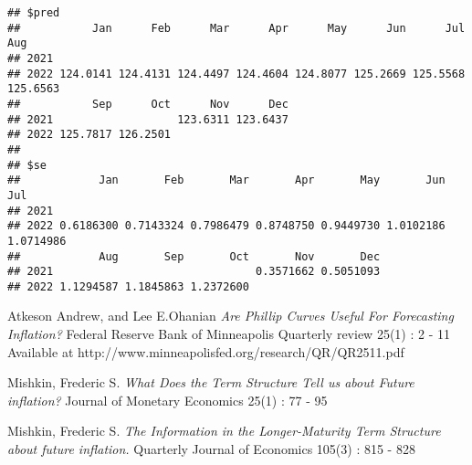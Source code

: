 \documentclass[
  12pt,
]{article}
\begin{document}
\begin{verbatim}
## $pred
##           Jan      Feb      Mar      Apr      May      Jun      Jul      Aug
## 2021                                                                        
## 2022 124.0141 124.4131 124.4497 124.4604 124.8077 125.2669 125.5568 125.6563
##           Sep      Oct      Nov      Dec
## 2021                   123.6311 123.6437
## 2022 125.7817 126.2501                  
## 
## $se
##            Jan       Feb       Mar       Apr       May       Jun       Jul
## 2021                                                                      
## 2022 0.6186300 0.7143324 0.7986479 0.8748750 0.9449730 1.0102186 1.0714986
##            Aug       Sep       Oct       Nov       Dec
## 2021                               0.3571662 0.5051093
## 2022 1.1294587 1.1845863 1.2372600
\end{verbatim}

\pagebreak
\begin{thebibliography}{}
    Atkeson Andrew, and Lee E.Ohanian
    \textit{Are Phillip Curves Useful For Forecasting Inflation?}
    Federal Reserve Bank of Minneapolis Quarterly review
    25(1) : 2 - 11
    Available at  http://www.minneapolisfed.org/research/QR/QR2511.pdf 
    
    Mishkin, Frederic S.
    \textit{What Does the Term Structure Tell us about Future inflation?}
    Journal of Monetary Economics 
    25(1) : 77 - 95
    
    Mishkin, Frederic S.
    \textit{The Information in the Longer-Maturity Term Structure about future inflation.}
    Quarterly Journal of Economics 
    105(3) : 815 - 828

\end{thebibliography}
\end{document}
